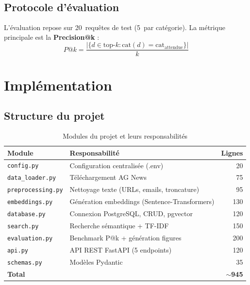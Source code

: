 \documentclass[12pt,a4paper]{article}
\begin{document}
\subsection{Protocole d'\'{e}valuation}

L'\'{e}valuation repose sur 20~requ\^{e}tes de test (5~par cat\'{e}gorie). La m\'{e}trique principale est la \textbf{Precision@k} :
\begin{equation}
P@k = \frac{|\{d \in \text{top-}k : \text{cat}(d) = \text{cat}_{\text{attendue}}\}|}{k}
\label{eq:patk}
\end{equation}

\section{Impl\'{e}mentation}
\label{sec:impl}

\subsection{Structure du projet}

\begin{table}[H]
\centering
\caption{Modules du projet et leurs responsabilit\'{e}s}
\label{tab:modules}
\begin{tabular}{@{}llr@{}}
\toprule
\textbf{Module} & \textbf{Responsabilit\'{e}} & \textbf{Lignes} \\
\midrule
\texttt{config.py}          & Configuration centralis\'{e}e (.env)        & 20 \\
\texttt{data\_loader.py}    & T\'{e}l\'{e}chargement AG News              & 75 \\
\texttt{preprocessing.py}   & Nettoyage texte (URLs, emails, troncature) & 95 \\
\texttt{embeddings.py}      & G\'{e}n\'{e}ration embeddings (Sentence-Transformers) & 130 \\
\texttt{database.py}        & Connexion PostgreSQL, CRUD, pgvector       & 120 \\
\texttt{search.py}          & Recherche s\'{e}mantique + TF-IDF           & 150 \\
\texttt{evaluation.py}      & Benchmark P@k + g\'{e}n\'{e}ration figures  & 200 \\
\texttt{api.py}             & API REST FastAPI (5 endpoints)             & 120 \\
\texttt{schemas.py}         & Mod\`{e}les Pydantic                       & 35 \\
\midrule
\textbf{Total}              &                                            & \textbf{$\sim$945} \\
\bottomrule
\end{tabular}
\end{table}
\end{document}
